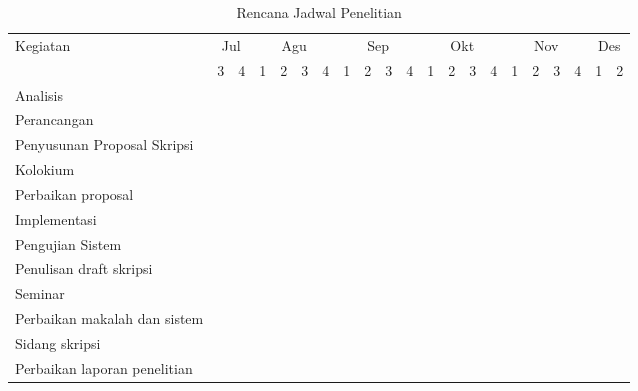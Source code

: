 \begin{table}[htb!]
	\begin{center}
		\caption{Rencana Jadwal Penelitian}
		\label{tab:jadwal}
		\footnotesize
		\begin{tabular}{|l|c|c|c|c|c|c|c|c|c|c|c|c|c|c|c|c|c|c|c|c|}
			\hline
			\multirow{2}{*}{Kegiatan}&\multicolumn{2}{c|}{Jul}&\multicolumn{4}{c|}{Agu}&\multicolumn{4}{c|}{Sep}&\multicolumn{4}{c|}{Okt}&\multicolumn{4}{c|}{Nov}&\multicolumn{2}{c|}{Des}\\
			\cline{2-21}
			&3&4&1&2&3&4&1&2&3&4&1&2&3&4&1&2&3&4&1&2\\
			\hline
			Analisis&\cellcolor{black}&\cellcolor{black}&\cellcolor{black}&&&&&&&&&&&&&&&&&\\
			\hline
			Perancangan&&\cellcolor{black}&\cellcolor{black}&\cellcolor{black}&&&&&&&&&&&&&&&&\\
			\hline
			Penyusunan Proposal Skripsi&&&&\cellcolor{black}&\cellcolor{black}&\cellcolor{black}&&&&&&&&&&&&&&\\
			\hline
			Kolokium&&&&&&&\cellcolor{black}&&&&&&&&&&&&&\\
			\hline
			Perbaikan proposal&&&&&&&\cellcolor{black}&\cellcolor{black}&&&&&&&&&&&&\\
			\hline
			Implementasi&&&&&&&&\cellcolor{black}&\cellcolor{black}&\cellcolor{black}&\cellcolor{black}&\cellcolor{black}&&&&&&&&\\
			\hline
			Pengujian Sistem&&&&&&&&&&&&\cellcolor{black}&&&&&&&&\\
			\hline
			Penulisan draft skripsi&&&&&&&&&&&&\cellcolor{black}&\cellcolor{black}&\cellcolor{black}&\cellcolor{black}&\cellcolor{black}&&&&\\
			\hline
			Seminar&&&&&&&&&&&&&&&&&\cellcolor{black}&&&\\
			\hline
			Perbaikan makalah dan sistem&&&&&&&&&&&&&&&&&\cellcolor{black}&\cellcolor{black}&&\\
			\hline
			Sidang skripsi&&&&&&&&&&&&&&&&&&&\cellcolor{black}&\\
			\hline
			Perbaikan laporan penelitian&&&&&&&&&&&&&&&&&&&&\cellcolor{black}\\
			\hline
		\end{tabular}
		\normalsize
	\end{center}
\end{table}